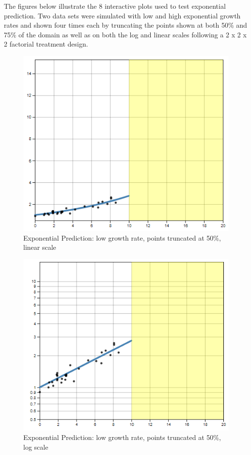 \documentclass[print]{nuthesis}
\begin{document}
The figures below illustrate the 8 interactive plots used to test exponential prediction.
Two data sets were simulated with low and high exponential growth rates and shown four times each by truncating the points shown at both 50\% and 75\% of the domain as well as on both the log and linear scales following a 2 x 2 x 2 factorial treatment design.

\begin{figure}[tbp]

{\centering \includegraphics[width=0.65\linewidth,]{images/02-you-draw-it/low-10-linear} 

}

\caption{Exponential Prediction: low growth rate, points truncated at 50\%, linear scale}\label{fig:low-10-linear}
\end{figure}

\begin{figure}[tbp]

{\centering \includegraphics[width=0.65\linewidth,]{images/02-you-draw-it/low-10-log} 

}

\caption{Exponential Prediction: low growth rate, points truncated at 50\%, log scale}\label{fig:low-10-log}
\end{figure}
\end{document}
